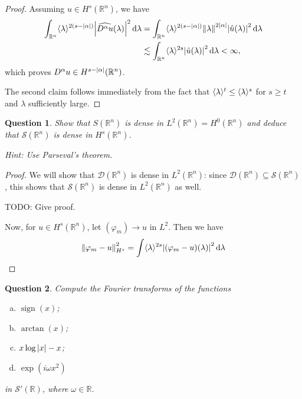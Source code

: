 \documentclass{article}
\theoremstyle{plain}
\newtheorem{question}{Question}
\theoremstyle{remark}
\renewcommand{\phi}{\varphi}
\newcommand{\Bb}{\mathbb}
\newcommand{\Cal}{\mathcal}
\newcommand{\RR}{\Bb R}
\newcommand{\DD}{\Cal D}
\renewcommand\SS{\Cal S}
\DeclarePairedDelimiter{\ang}{\langle}{\rangle}
\newcommand\TODO{{\color{red} TODO: }}
\newcommand\les\lesssim
\DeclareMathOperator{\sign}{sign}
\begin{document}
\begin{proof}
	Assuming $u \in H^s(\RR^n)$, we have
	\begin{align*}
		\int_{\RR^n} \ang{\lambda}^{2(s - \abs{\alpha})} \abs{\widehat{D^\alpha u}(\lambda)}^2 \dd{\lambda}  &= \int_{\RR^n} \ang{\lambda}^{2(s-\abs{\alpha})} \norm{\lambda}^{2\abs{\alpha}} \abs{\hat u(\lambda)}^2 \dd{\lambda} \\
		&\les \int_{\RR^n} \ang{\lambda}^{2s} \abs{\hat u(\lambda)}^2 \dd{\lambda} < \infty, 
	\end{align*}
which proves $D^\alpha u \in H^{s- \abs{\alpha}}(\RR^n)$.

The second claim follows immediately from the fact that $\ang{\lambda}^{t} \leq \ang{\lambda}^s$ for $s \geq t$ and $\lambda$ sufficiently large. 
\end{proof}


\begin{question}
	Show that $S(\RR^n)$ is dense in $L^2(\RR^n) = H^0(\RR^n)$ and deduce that $\SS(\RR^n)$ is dense in $H^s(\RR^n)$.
	
	\emph{Hint:} Use Parseval's theorem. 
\end{question}

\begin{proof}
	We will show that $\DD(\RR^n)$ is dense in $L^2(\RR^n)$: since $\DD(\RR^n) \subseteq \SS(\RR^n)$, this shows that $\SS(\RR^n)$ is dense in $L^2(\RR^n)$ as well. 
	
	\TODO Give proof.
	
	Now, for $u \in H^s(\RR^n)$, let $(\phi_m) \to u$ in $L^2$. Then we have
	\begin{align*}
		\norm{\phi_m - u}_{H^s}^2 = \int \ang{\lambda}^{2s} \abs{(\phi_m - u)(\lambda)}^2 \dd{\lambda}
	\end{align*}
\end{proof}
\setcounter{question}{18}

\begin{question}
	Compute the Fourier transforms of the functions
	\begin{enumerate}[(a)]
		\item $\sign(x)$;
		\item $\arctan(x)$;
		\item $x\log \abs{x} - x$;
		\item $\exp(i\omega x^2)$
	\end{enumerate}
	in $\SS'(\RR)$, where $\omega \in \RR$. 
\end{question}
\end{document}
